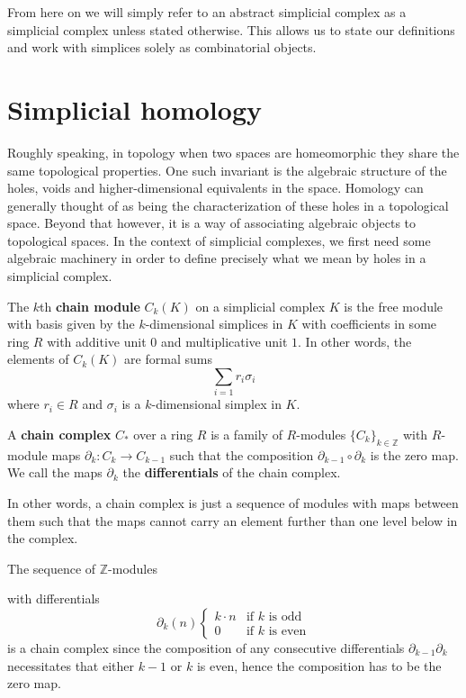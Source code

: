 From here on we will simply refer to an abstract simplicial complex as a simplicial complex unless stated otherwise. This allows us to state our definitions and work with simplices solely as combinatorial objects.
\section{Simplicial homology}
Roughly speaking, in topology when two spaces are homeomorphic they share the same topological properties. One such invariant is the algebraic structure of the holes, voids and higher-dimensional equivalents in the space.
Homology can generally thought of as being the characterization of these holes in a topological space. Beyond that however, it is a way of associating algebraic objects to topological spaces. In the context of simplicial complexes, we first need some algebraic machinery in order to define precisely what we mean by holes in a simplicial complex.

\begin{definition}
  The $k$th \textbf{chain module} $C_{k}(K)$ on a simplicial complex $K$ is the free module with basis given by the $k$-dimensional simplices in $K$ with coefficients in some ring $R$ with additive unit $0$ and multiplicative unit $1$. In other words, the elements of $C_{k}(K)$ are formal sums
  \[ \sum_{i=1} r_{i}\sigma_{i}\]
  where $r_{i} \in R$ and $\sigma_{i}$ is a $k$-dimensional simplex in $K$.
\end{definition}
\begin{definition}
  A \textbf{chain complex} $C_{*}$ over a ring $R$ is a family of $R$-modules $\{C_{k}\}_{k
  \in \mathbb{Z}}$ with $R$-module maps $\partial_{k}: C_{k} \to C_{k-1}$ such that the composition $\partial_{k-1} \circ \partial_{k}$ is the zero map. We call the maps $\partial_{k}$ the \textbf{differentials} of the chain complex.
\end{definition}

In other words, a chain complex is just a sequence of modules with maps between them such that the maps cannot carry an element further than one level below in the complex.
\begin{example}
  The sequence of $\mathbb{Z}$-modules
\begin{center}
\end{center}
with differentials
\[ \partial_{k}(n)
  \begin{cases} k \cdot n & \text{if }k \text{ is odd} \\
                0 & \text{if }k \text{ is even}
    \end{cases}
  \]
is a chain complex since the composition of any consecutive differentials $\partial_{k-1}\partial_{k}$ necessitates that either $k-1$ or $k$ is even, hence the composition has to be the zero map.
\end{example}

